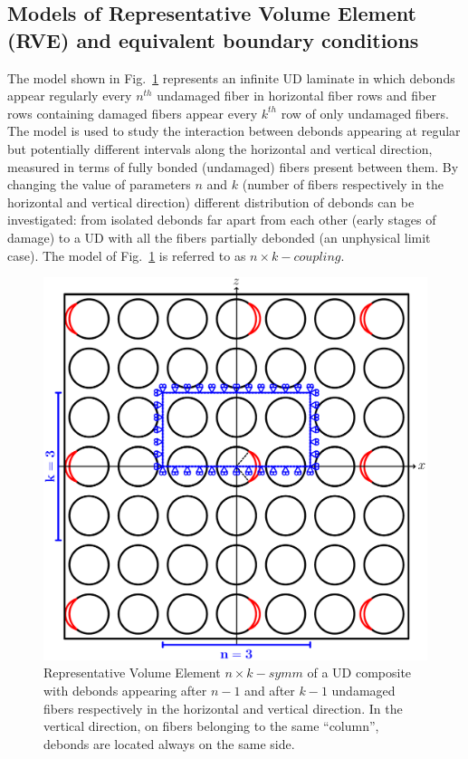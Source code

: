 \documentclass[smallextended]{svjour3}       %
\begin{document}
\subsection{Models of Representative Volume Element (RVE) and equivalent boundary conditions}\label{subsec:rve}

The model shown in Fig.~\ref{fig:laminateModelsA} represents an infinite UD laminate in which debonds appear regularly every $n^{th}$ undamaged fiber in horizontal fiber rows and fiber rows containing damaged fibers appear every $k^{th}$ row of only undamaged fibers. The model is used to study the interaction between debonds appearing at regular but potentially different intervals along the horizontal and vertical direction, measured in terms of fully bonded (undamaged) fibers present between them. By changing the value of parameters $n$ and $k$ (number of fibers respectively in the horizontal and vertical direction) different distribution of debonds can be investigated: from isolated debonds far apart from each other (early stages of damage) to a UD with all the fibers partially debonded (an unphysical limit case). The model of Fig.~\ref{fig:laminateModelsA} is referred to as $n\times k-coupling$.

\begin{figure}[!h]
\centering
\includegraphics[width=\textwidth]{coupling.pdf}
\caption{Representative Volume Element $n\times k-symm$ of a UD composite with debonds appearing after $n-1$ and after $k-1$ undamaged fibers respectively in the horizontal and vertical direction. In the vertical direction, on fibers belonging to the same ``column'', debonds are located always on the same side.}\label{fig:laminateModelsA}
\end{figure}
\end{document}
